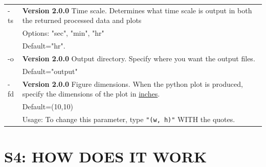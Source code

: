 \documentclass[12pt]{article}
\begin{document}
\begin{center}
\begin{xltabular}{\textwidth}{lX}
\hline
-ts & \textbf{Version 2.0.0} Time scale. Determines what time scale is output in both the returned processed data and plots\\
 & Options: "sec", "min", "hr"\\
 & Default="hr".\\
\hline
-o & \textbf{Version 2.0.0} Output directory. Specify where you want the output files.\\
 & Default="output"\\
\hline
-fd & \textbf{Version 2.0.0} Figure dimensions. When the python plot is produced, specify the dimensions of the plot in \uline{inches}.\\
 & Default=(10,10)\\
 & Usage: To change this parameter, type \texttt{"(w, h)"} WITH the quotes.\\
\end{xltabular}
\end{center}

\section*{S4: HOW DOES IT WORK}
\label{sec:org6561171}
\end{document}
